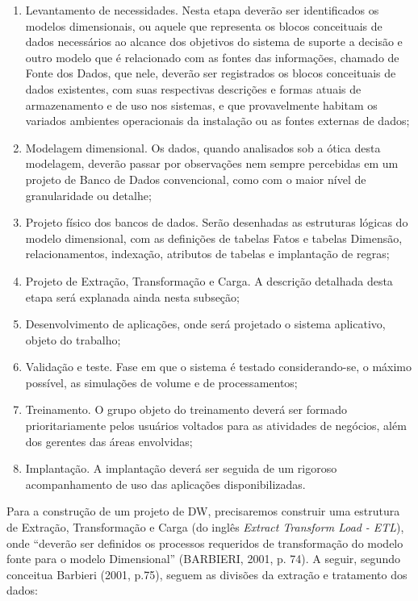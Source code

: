 \documentclass[a4paper]{article}
\newcommand\liststyleWWviiiNumxxxvi{%
\renewcommand\theenumi{\alph{enumi}}
\renewcommand\theenumii{\alph{enumii}}
\renewcommand\theenumiii{\roman{enumiii}}
\renewcommand\theenumiv{\arabic{enumiv}}
\renewcommand\labelenumi{\theenumi)}
\renewcommand\labelenumii{\theenumii.}
\renewcommand\labelenumiii{\theenumiii.}
\renewcommand\labelenumiv{\theenumiv.}
}
\begin{document}
\liststyleWWviiiNumxxxvi
\begin{enumerate}
\item {
\textsf{Levantamento de necessidades. Nesta etapa dever\~ao ser identificados os modelos dimensionais, ou aquele que
representa os blocos conceituais de dados necess\'arios ao alcance dos objetivos do sistema de suporte a decis\~ao e
outro modelo que \'e relacionado com as fontes das informa\c{c}\~oes, chamado de Fonte dos Dados, que nele, dever\~ao
ser registrados os blocos conceituais de dados existentes, com suas respectivas descri\c{c}\~oes e formas atuais de
armazenamento e de uso nos sistemas, e que provavelmente habitam os variados ambientes operacionais da instala\c{c}\~ao
ou as fontes externas de dados;}}
\item {
\textsf{Modelagem dimensional. Os dados, quando analisados sob a \'otica desta modelagem, dever\~ao passar por
observa\c{c}\~oes nem sempre percebidas em um projeto de Banco de Dados convencional, como com o maior n\'ivel de
granularidade ou detalhe;}}
\item {
\textsf{Projeto f\'isico dos bancos de dados. Ser\~ao desenhadas as estruturas l\'ogicas do modelo dimensional, com as
defini\c{c}\~oes de tabelas Fatos e tabelas Dimens\~ao, relacionamentos, indexa\c{c}\~ao, atributos de tabelas e
implanta\c{c}\~ao de regras; }}
\item {
\textsf{Projeto de Extra\c{c}\~ao, Transforma\c{c}\~ao e Carga. A descri\c{c}\~ao detalhada desta etapa ser\'a explanada
ainda nesta subse\c{c}\~ao;}}
\item {\sffamily
Desenvolvimento de aplica\c{c}\~oes, onde ser\'a projetado o sistema aplicativo, objeto do trabalho;}
\item {\sffamily
Valida\c{c}\~ao e teste. Fase em que o sistema \'e testado considerando-se, o m\'aximo poss\'ivel, as simula\c{c}\~oes
de volume e de processamentos;}
\item {\sffamily
Treinamento. O grupo objeto do treinamento dever\'a ser formado prioritariamente pelos usu\'arios voltados para as
atividades de neg\'ocios, al\'em dos gerentes das \'areas envolvidas;}
\item {\sffamily
Implanta\c{c}\~ao. A implanta\c{c}\~ao dever\'a ser seguida de um rigoroso acompanhamento de uso das aplica\c{c}\~oes
disponibilizadas.}
\end{enumerate}
{
\textsf{Para a constru\c{c}\~ao de um projeto de DW, precisaremos construir uma estrutura de Extra\c{c}\~ao,
Transforma\c{c}\~ao e Carga (do ingl\^es }\textsf{\textit{Extract Transform Load}}\textsf{ }\textsf{\textit{{}-
ETL}}\textsf{), onde ``dever\~ao ser definidos os processos requeridos de transforma\c{c}\~ao do modelo fonte para o
modelo Dimensional'' (BARBIERI, 2001, p. 74). A seguir, segundo conceitua Barbieri (2001, p.75), seguem as divis\~oes
da extra\c{c}\~ao e tratamento dos dados:}}
\end{document}
